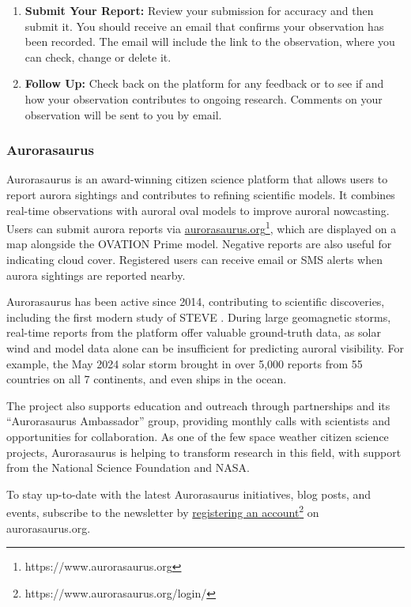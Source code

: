 \documentclass{article}
\renewcommand{\cite}[1]{\parencite{#1}}
\begin{document}
\begin{enumerate}
    \item \textbf{Submit Your Report:} Review your submission for accuracy and then submit it. You should receive an email that confirms your observation has been recorded.  The email will include the link to the observation, where you can check, change or delete it. 
    
    \item \textbf{Follow Up:} Check back on the platform for any feedback or to see if and how your observation contributes to ongoing research. Comments on your observation will be sent to you by email.
\end{enumerate}


\subsubsection{Aurorasaurus}\label{aurorasaurus}%

Aurorasaurus \cite{MacDonald2015} is an award-winning citizen science platform that allows users to report aurora sightings and contributes to refining scientific models. It combines real-time observations with auroral oval models to improve auroral nowcasting. Users can submit aurora reports via \href{https://www.aurorasaurus.org/}{aurorasaurus.org}\footnote{https://www.aurorasaurus.org}, which are displayed on a map alongside the OVATION Prime model. Negative reports are also useful for indicating cloud cover. Registered users can receive email or SMS alerts when aurora sightings are reported nearby.

Aurorasaurus has been active since 2014, contributing to scientific discoveries, including the first modern study of STEVE \cite{MacDonald2018}. During large geomagnetic storms, real-time reports from the platform offer valuable ground-truth data, as solar wind and model data alone can be insufficient for predicting auroral visibility. For example, the May 2024 solar storm brought in over 5,000 reports from 55 countries on all 7 continents, and even ships in the ocean.

The project also supports education and outreach through partnerships and its ``Aurorasaurus Ambassador'' group, providing monthly calls with scientists and opportunities for collaboration. As one of the few space weather citizen science projects, Aurorasaurus is helping to transform research in this field, with support from the National Science Foundation and NASA.

To stay up-to-date with the latest Aurorasaurus initiatives, blog posts, and events, subscribe to the newsletter by \href{https://www.aurorasaurus.org/login/}{registering an account}\footnote{https://www.aurorasaurus.org/login/} on aurorasaurus.org.
\end{document}
